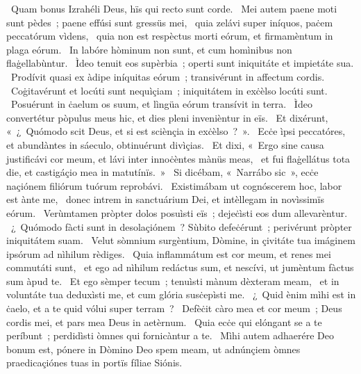 \psalmChapterWithInscription{}
{ }
{%
~Quam bonus Izrahéli Deus, hïs qui recto sunt corde. 
~Mei autem paene moti sunt pèdes~; paene effúsi sunt gressüs mei, 
~quia zelávi super iníquos, paċem peccatórum vìdens, 
~quia non est respèctus morti eórum, et firmamèntum in plaga eórum. 
~In labóre hòminum non sunt, et cum homìnibus non flaġellabùntur. 
~Ìdeo tenuit eos supèrbia~; operti sunt iniquitáte et impietáte sua. 
~Prodívit quasi ex àdipe iníquitas eórum~; transivérunt in affectum cordis. 
~Coġitavérunt et locúti sunt nequìçiam~; iniquitátem in exċèlso locúti sunt. 
~Posuérunt in ċaelum os suum, et lìngüa eórum transívit in terra. 
~Ìdeo convertétur pòpulus meus hic, et dies pleni invenièntur in eïs. 
~Et dixérunt, «~¿~Quómodo scit Deus, et si est sciènçia in exċèlso~?~». 
~Ecċe ìpsi peccatóres, et abundàntes in sáeculo, obtinuérunt divìçias. 
~Et dixi, «~Ergo sine causa justificávi cor meum, et lávi inter innoċèntes mànüs meas, 
~et fui flaġellátus tota die, et castigáçio mea in matutínïs.~»
~Si dicébam, «~Narrábo sic~», ecċe naçiónem filiórum tuórum reprobávi. 
~Existimábam ut cognóscerem hoc, labor est ànte me, 
~donec intrem in sanctuárium Dei, et intèllegam in novìssimïs eórum. 
~Verùmtamen pròpter dolos posuìsti eïs~; dejeċìsti eos dum allevarèntur. 
~¿~Quómodo fàcti sunt in desolaçiónem~? Sùbito defeċérunt~; perivérunt pròpter iniquitátem suam. 
~Velut sòmnium surgèntium, Dòmine, in çivitáte tua imáginem ipsórum ad nìhilum rèdiges. 
~Quia inflammátum est cor meum, et renes mei commutáti sunt, 
~et ego ad nìhilum redáctus sum, et nescívi, ut jumèntum fàctus sum àpud te. 
~Et ego sèmper tecum~; tenuìsti mànum dèxteram meam, 
~et in voluntáte tua deduxìsti me, et cum glória susċepìsti me. 
~¿~Quid ènim mìhi est in ċaelo, et a te quid vólui super terram~? 
~Defèċit càro mea et cor meum~; Deus cordis mei, et pars mea Deus in aetèrnum. 
~Quia ecċe qui elóngant se a te períbunt~; perdidìsti òmnes qui fornicàntur a te. 
~Mìhi autem adhaerére Deo bonum est, pónere in Dòmino Deo spem meam, ut adnúnçiem òmnes praedicaçiónes tuas in portïs fíliae Siónis. 
}
